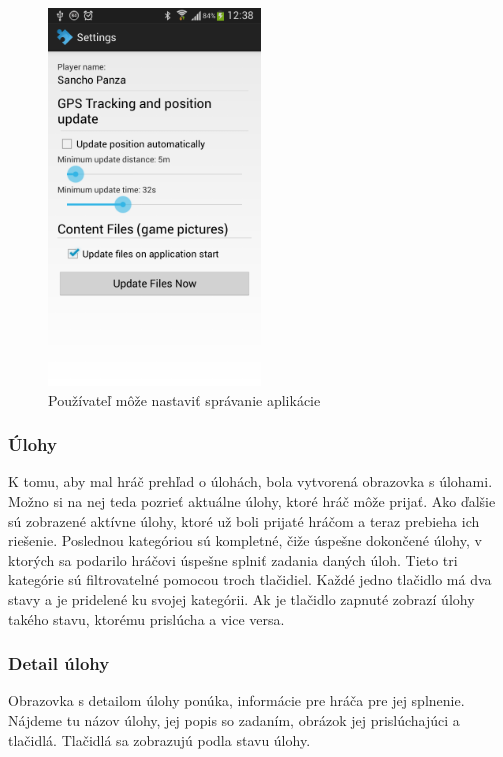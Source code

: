 \begin{figure}[h]
  \centering
  \includegraphics[height=10cm]{mainmatter/imgs/klient_settings.png}
  \caption{Používateľ môže nastaviť správanie aplikácie}
  \label{fig:klient_settings}
\end{figure}



\subsubsection{Úlohy}
K tomu, aby mal hráč prehľad o úlohách, bola vytvorená obrazovka s úlohami. Možno si na nej teda pozrieť aktuálne úlohy, ktoré hráč môže prijať. Ako ďalšie sú zobrazené aktívne úlohy, ktoré už boli prijaté hráčom a teraz prebieha ich riešenie. Poslednou kategóriou sú kompletné, čiže úspešne dokončené úlohy, v ktorých sa podarilo hráčovi úspešne splniť zadania daných úloh. Tieto tri kategórie sú filtrovatelné pomocou troch tlačidiel. Každé jedno tlačidlo má dva stavy a je pridelené ku svojej kategórii. Ak je tlačidlo zapnuté zobrazí úlohy takého stavu, ktorému prislúcha a vice versa.

\subsubsection{Detail úlohy}
Obrazovka s detailom úlohy ponúka, informácie pre hráča pre jej splnenie. Nájdeme tu názov úlohy, jej popis so zadaním, obrázok jej prislúchajúci a tlačidlá. Tlačidlá sa zobrazujú podla stavu úlohy. 

